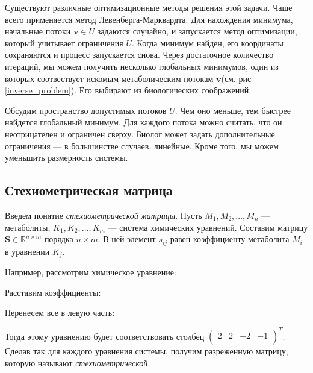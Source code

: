 \documentclass[14pt, a4paper]{extreport}
\begin{document}
Существуют различные оптимизационные методы решения этой задачи. Чаще всего применяется метод Левенберга-Марквардта. Для нахождения минимума, начальные потоки $\mathbf{v} \in U$ задаются случайно, и запускается метод оптимизации, который учитывает ограничения $U$. Когда минимум найден, его координаты сохраняются и процесс запускается снова. Через достаточное количество итераций, мы можем получить несколько глобальных минимумов, один из которых соотвествует искомым метаболическим потокам $\mathbf{v}$(см. рис \ref{inverse_problem}). Его выбирают из биологических соображений.

Обсудим пространство допустимых потоков $U$. Чем оно меньше, тем быстрее найдется глобальный минимум. Для каждого потока можно считать, что он неотрицателен и ограничен сверху. Биолог может задать дополнительные ограничения --- в большинстве случаев, линейные. Кроме того, мы можем уменьшить размерность системы.

\subsection{Стехиометрическая матрица}

Введем понятие \emph{стехиометрической матрицы}. Пусть $M_1, M_2, \dots, M_n$ --- метаболиты, $K_1, K_2, \dots, K_m$ --- система химических уравнений. 
Составим матрицу $\mathbf{S} \in \mathbb{R}^{n \times m}$ порядка $n \times m$. В ней элемент $s_{ij}$ равен коэффициенту метаболита $M_i$ в уравнении $K_j$.

Например, рассмотрим химическое уравнение:

\begin{center}
\end{center}

Расставим коэффициенты:

\begin{center}
\end{center}

Перенесем все в левую часть:

\begin{center}
\end{center}
Тогда этому уравнению будет соответствовать столбец $\begin{pmatrix}
2 & 2 & -2 & -1\\
\end{pmatrix}^T$. Сделав так для каждого уравнения системы, получим разреженную матрицу, которую называют \emph{стехиометрической}.
\end{document}
